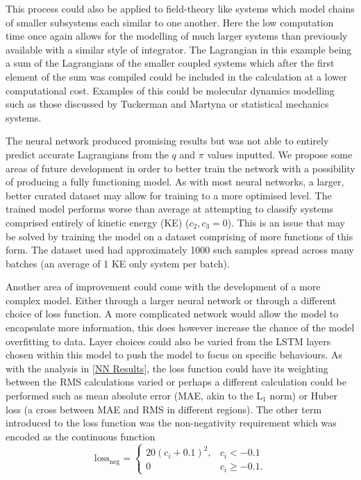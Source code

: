 \documentclass[10pt]{iopart}
\begin{document}
This process could also be applied to field-theory like systems which model chains of smaller subsystems each similar to one another. Here the low computation time once again allows for the modelling of much larger systems than previously available with a similar style of integrator. The Lagrangian in this example being a sum of the Lagrangians of the smaller coupled systems which after the first element of the sum was compiled could be included in the calculation at a lower computational cost. Examples of this could be molecular dynamics modelling such as those discussed by Tuckerman and Martyna \cite{MolecularDynamics} or statistical mechanics systems. 

The neural network produced promising results but was not able to entirely predict accurate Lagrangians from the $q$ and $\pi$ values inputted. We propose some areas of future development in order to better train the network with a possibility of producing a fully functioning model. As with most neural networks, a larger, better curated dataset may allow for training to a more optimised level. The trained model performs worse than average at attempting to classify systems comprised entirely of kinetic energy (KE) ($c_2,c_3 = 0$). This is an issue that may be solved by training the model on a dataset comprising of more functions of this form. The dataset used had approximately 1000 such samples spread across many batches (an average of 1 KE only system per batch). 

Another area of improvement could come with the development of a more complex model. Either through a larger neural network or through a different choice of loss function. A more complicated network would allow the model to encapsulate more information, this does however increase the chance of the model overfitting to data. Layer choices could also be varied from the LSTM layers chosen within this model to push the model to focus on specific behaviours.  As with the analysis in \ref{NN Results}, the loss function could have its weighting between the RMS calculations varied or perhaps a different calculation could be performed such as mean absolute error (MAE, akin to the L$_1$ norm) or Huber loss (a cross between MAE and RMS in different regions). 
The other term introduced to the loss function was the non-negativity requirement which was encoded as the continuous function 
\begin{equation}
	\label{nonnegLoss}
	\textrm{loss}_{\textrm{neg}} = 
	\begin{cases}
		20(c_i + 0.1)^2, &c_i<-0.1\\
		0 &c_i \geq -0.1.
	\end{cases}
\end{equation}
\end{document}

